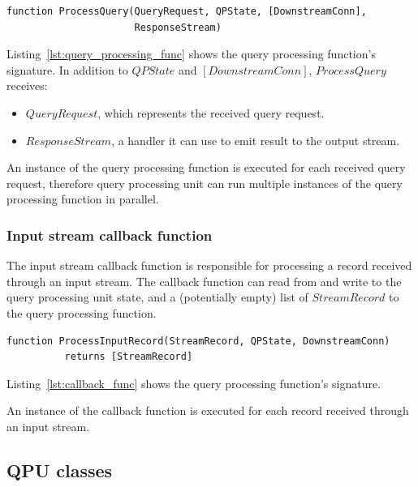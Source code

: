\begin{lstlisting}[caption={Query processing function signature},captionpos=b,label={lst:query_processing_func}]
function ProcessQuery(QueryRequest, QPState, [DownstreamConn],
                      ResponseStream)
\end{lstlisting}

\noindent
\begin{sloppypar}
Listing~\ref{lst:query_processing_func} shows the query processing function's signature.
In addition to $QPState$ and $[DownstreamConn]$, $ProcessQuery$ receives:
\end{sloppypar}
\begin{itemize}
  \item $QueryRequest$, which represents the received query request.

  \item $ResponseStream$, a handler it can use to emit result to the output stream.

\end{itemize}

An instance of the query processing function is executed for each received query request,
therefore query processing unit can run multiple instances of the query processing function in parallel.

\subsubsection{Input stream callback function}
\label{sec:callback_func}

The input stream callback function is responsible for processing a record received through an input stream.
The callback function can read from and write to the query processing unit state,
and a (potentially empty) list of $StreamRecord$ to the query processing function.

\begin{lstlisting}[caption={Input stream callback function signature},captionpos=b,label={lst:callback_func}]
function ProcessInputRecord(StreamRecord, QPState, DownstreamConn)
          returns [StreamRecord]
\end{lstlisting}

\noindent
Listing~\ref{lst:callback_func} shows the query processing function's signature.

An instance of the callback function is executed for each record received through an input stream.


\subsection{QPU classes}
\label{sec:qpu_classes}

